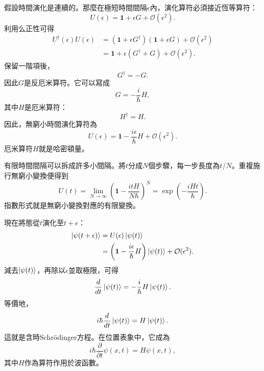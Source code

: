 假設時間演化是連續的。那麼在極短時間間隔\(\epsilon\)內，演化算符必須接近恆等算符：
\begin{equation}
U(\epsilon)=\mathbf 1+\epsilon G+\mathcal O(\epsilon^2).
\end{equation}
利用么正性可得
\begin{align}
U^\dagger(\epsilon)U(\epsilon)
&=
\left(\mathbf 1+\epsilon G^\dagger\right)
\left(\mathbf 1+\epsilon G\right)
+\mathcal O(\epsilon^2)
\\
&=
\mathbf 1+\epsilon(G^\dagger+G)
+\mathcal O(\epsilon^2).
\end{align}
保留一階項後，
\begin{equation}
G^\dagger=-G.
\end{equation}
因此\(G\)是反厄米算符。它可以寫成
\begin{equation}
G=-\frac{i}{\hbar}H,
\end{equation}
其中\(H\)是厄米算符：
\begin{equation}
H^\dagger=H.
\end{equation}
因此，無窮小時間演化算符為
\begin{equation}
U(\epsilon)
=
\mathbf 1-\frac{i\epsilon}{\hbar}H
+\mathcal O(\epsilon^2).
\end{equation}
厄米算符\(H\)就是哈密頓量。

\begin{classroomqa}
\end{classroomqa}

有限時間間隔可以拆成許多小間隔。將\(t\)分成\(N\)個步驟，每一步長度為\(t/N\)。重複施行無窮小變換便得到
\begin{equation}
U(t)
=
\lim_{N\to\infty}
\left(
\mathbf 1-\frac{itH}{N\hbar}
\right)^N
=
\exp\left(-\frac{iHt}{\hbar}\right).
\end{equation}
指數形式就是無窮小變換對應的有限變換。

現在將態從\(t\)演化至\(t+\epsilon\)：
\begin{align}
\left\lvert\psi(t+\epsilon)\right\rangle
&=
U(\epsilon)\left\lvert\psi(t)\right\rangle
\\
&=
\left(
\mathbf 1-\frac{i\epsilon}{\hbar}H
\right)\left\lvert\psi(t)\right\rangle
+\mathcal O(\epsilon^2).
\end{align}
減去\(\left\lvert\psi(t)\right\rangle\)，再除以\(\epsilon\)並取極限，可得
\begin{equation}
\frac{d}{dt}\left\lvert\psi(t)\right\rangle
=
-\frac{i}{\hbar}H\left\lvert\psi(t)\right\rangle.
\end{equation}
等價地，
\begin{equation}
i\hbar\frac{d}{dt}\left\lvert\psi(t)\right\rangle
=
H\left\lvert\psi(t)\right\rangle.
\end{equation}
這就是含時Schr\"odinger方程。在位置表象中，它成為
\begin{equation}
i\hbar\frac{\partial}{\partial t}\psi(x,t)
=
H\psi(x,t),
\end{equation}
其中\(H\)作為算符作用於波函數。

